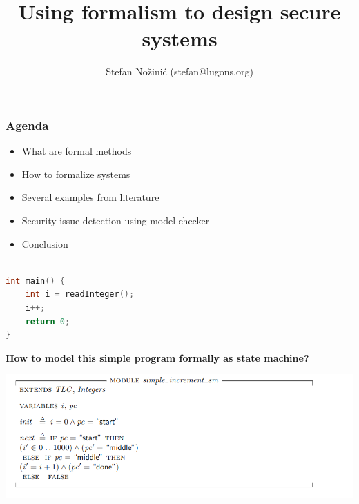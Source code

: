\documentclass{beamer}
\begin{document}
\title{Using formalism to design secure systems}
\author{Stefan Nožinić (stefan@lugons.org)}

\frame{
\titlepage
}

\begin{frame}
    \frametitle{Agenda}
    \begin{itemize}
        \item What are formal methods
        \item How to formalize systems 
        \item Several examples from literature 
        \item Security issue detection using model checker
        \item Conclusion
    \end{itemize}

\end{frame}

\begin{frame}[fragile]
	\begin{lstlisting}[language=C++]

int main() {
    int i = readInteger();
    i++;
    return 0;
}

	\end{lstlisting}
	
\end{frame}

\begin{frame}
    \begin{center}
        \LARGE{\textbf{How to model this simple program formally as state machine?}}
    \end{center}

\end{frame}


\begin{frame}[fragile]
    \includegraphics[width=\textwidth]{./sm_increment.png}
\end{frame}
\end{document}
